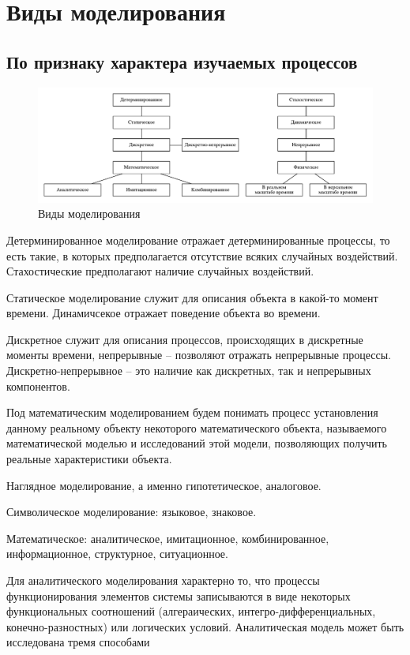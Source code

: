 \section{Виды моделирования}

\subsection{По признаку характера изучаемых процессов}

\begin{figure}[H]
    \centering
    \includegraphics[scale=0.6]{img/content/03_types_modeling/types_modeling.pdf}
    \caption{Виды моделирования}
\end{figure}

Детерминированное моделирование отражает детерминированные процессы, то есть такие, в которых предполагается отсутствие всяких случайных воздействий. Стахостические предполагают наличие случайных воздействий.

Статическое моделирование служит для описания объекта в какой-то момент времени. Динамичсекое отражает поведение объекта во времени.

Дискретное служит для описания процессов, происходящих в дискретные моменты времени, непрерывные -- позволяют отражать непрерывные процессы. Дискретно-непрерывное -- это наличие как дискретных, так и непрерывных компонентов.

Под математическим моделированием будем понимать процесс установления данному реальному объекту некоторого математического объекта, называемого математической моделью и исследований этой модели, позволяющих получить реальные характеристики объекта.

Наглядное моделирование, а именно гипотетическое, аналоговое.

Символическое моделирование: языковое, знаковое.

Математическое: аналитическое, имитационное, комбинированное, информационное, структурное, ситуационное.

Для аналитического моделирования характерно то, что процессы функционирования элементов системы записываются в виде некоторых функциональных соотношений (алгераических, интегро-дифференциальных, конечно-разностных) или логических условий. Аналитическая модель может быть исследована тремя способами

